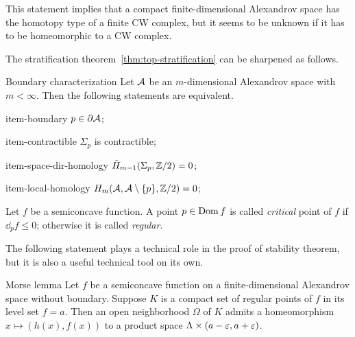 This statement implies that a compact finite-dimensional Alexandrov space has the homotopy type of a finite CW complex,
but it seems to be unknown if it has to be homeomorphic to a CW complex.

The stratification theorem~\ref{thm:top-stratification} can be sharpened as follows.

\begin{thm}{Boundary characterization}
Let $\mathcal{A}$ be an $m$-dimensional Alexandrov space with $m<\infty$.
Then the following statements are equivalent.

\begin{subthm}{item-boundary} $p\in \partial \mathcal{A}$;
\end{subthm}

\begin{subthm}{item-contractible} $\Sigma_p$ is contractible;
\end{subthm}

\begin{subthm}{item-space-dir-homology} $\tilde H_{m-1}(\Sigma_p,\mathbb{Z}/2)= 0$;
\end{subthm}

\begin{subthm}{item-local-homology} $H_m(\mathcal{A},\mathcal{A}\setminus \{p\},\mathbb{Z}/2)= 0$;
\end{subthm}

\end{thm}

Let $f$ be a semiconcave function.
A point $p\in \mathop{\rm Dom}\nolimits f$ is called \emph{critical} point of $f$ if $\dd_pf\le 0$; 
otherwise it is called \emph{regular}.

The following statement plays a technical role in the proof of stability theorem,
but it is also a useful technical tool on its own.

\begin{thm}{Morse lemma}
Let $f$ be a semiconcave function on a finite-dimensional Alexandrov space without boundary.
Suppose $K$ is a compact set of regular points of $f$ in its level set $f=a$.
Then an open neighborhood $\Omega$ of $K$ admits a homeomorphism $x\mapsto (h(x),f(x))$ to a product space $\Lambda\times (a-\varepsilon,a+\varepsilon)$.
\end{thm}

